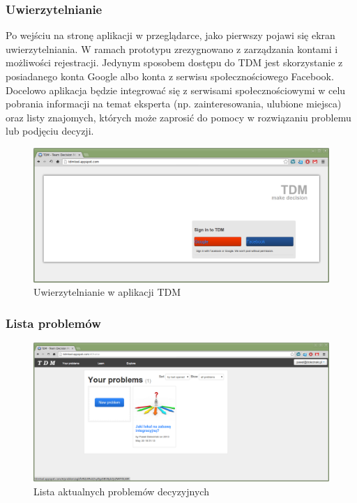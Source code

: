 \subsubsection{Uwierzytelnianie}
Po wejściu na stronę aplikacji w przeglądarce, jako pierwszy pojawi się ekran
uwierzytelniania. W ramach prototypu zrezygnowano z zarządzania kontami i
możliwości rejestracji. Jedynym sposobem dostępu do TDM jest skorzystanie z posiadanego
konta Google albo konta z serwisu społecznościowego Facebook. Docelowo aplikacja
będzie integrować się z serwisami społecznościowymi w celu pobrania informacji
na temat eksperta (np. zainteresowania, ulubione miejsca) oraz listy znajomych,
których może zaprosić do pomocy w rozwiązaniu problemu lub podjęciu decyzji.
\begin{figure}[!htbp]
  \includegraphics[width=\linewidth]
    {chapters/prototyp/tdm_authentication}
  \caption{Uwierzytelnianie w aplikacji TDM}
  \label{fig:authentication}
\end{figure}

\subsubsection{Lista problemów}
\begin{figure}[!htbp]
  \includegraphics[width=\linewidth]
    {chapters/prototyp/tdm_problem_list}
  \caption{Lista aktualnych problemów decyzyjnych}
  \label{fig:problem_list}
\end{figure}

